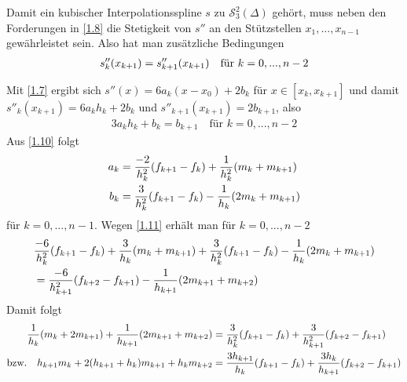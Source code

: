 Damit ein kubischer Interpolationsspline $s$ zu $\mathcal{S}^2_3(\Delta)$ gehört, muss neben den Forderungen in \cref{1.8} die Stetigkeit von $s''$ an den Stützstellen $x_1,...,x_{n-1}$ gewährleistet sein. Also hat man zusätzliche Bedingungen
\begin{align}
	s''_k(x_{k+1})=s''_{k+1}(x_{k+1})\quad\text{für } k=0,...,n-2\notag
\end{align}
\begin{center}
\end{center}
Mit \cref{1.7} ergibt sich $s''(x)=6a_k(x-x_0)+2b_k$ für $x\in[x_k,x_{k+1}]$ und damit $s''_k(x_{k+1}) = 6a_kh_k+2b_k$ und $s''_{k+1}(x_{k+1})=2b_{k+1}$, also 
\begin{align}
	\label{1.11}
	3a_kh_k+b_k=b_{k+1}\quad\text{für }k=0,...,n-2
\end{align}
Aus \cref{1.10} folgt
\begin{align}
	a_k &= \frac{-2}{h_k^2}(f_{k+1}-f_k)+\frac{1}{h_k^2}(m_k+m_{k+1}) \notag \\
	b_k &= \frac{3}{h_k^2}(f_{k+1}-f_k)-\frac{1}{h_k}(2m_k+m_{k+1})\notag
\end{align}
für $k=0,...,n-1$. Wegen \cref{1.11} erhält man für $k=0,...,n-2$
\begin{align}
	& \frac{-6}{h_k^2}(f_{k+1}-f_k) + \frac{3}{h_k}(m_k+m_{k+1}) + \frac{3}{h_k^2}(f_{k+1}-f_k) - \frac{1}{h_k}(2m_k+m_{k+1}) \notag \\
	&= \frac{-6}{h^2_{k+1}}(f_{k+2}-f_{k+1})-\frac{1}{h_{k+1}}(2m_{k+1}+m_{k+2})\notag
\end{align}
Damit folgt 
\begin{align}
	\frac{1}{h_k}(m_k+2m_{k+1}) + \frac{1}{h_{k+1}}(2m_{k+1}+m_{k+2}) &= \frac{3}{h_k^2}(f_{k+1}-f_k) + \frac{3}{h_{k+1}^2}(f_{k+2}-f_{k+1})\notag \\
	\text{bzw.}\quad h_{k+1}m_k + 2(h_{k+1}+h_k)m_{k+1}+h_km_{k+2} &= \frac{3h_{k+1}}{h_k}(f_{k+1}-f_k) + \frac{3h_k}{h_{k+1}}(f_{k+2}-f_{k+1})\notag
\end{align}
